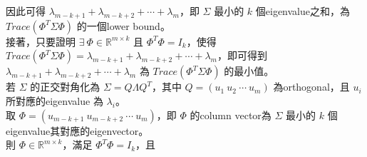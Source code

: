 \documentclass{article}
\begin{document}
因此可得 $\lambda_{m - k + 1} + \lambda_{m - k + 2} + \cdots + \lambda_m$，即 $\Sigma$ 最小的 $k$ 個eigenvalue之和，為 $Trace(\Phi^T \Sigma \Phi)$ 的一個lower bound。\\
接著，只要證明 $\exists\ \Phi \in {\mathbb R}^{m \times k}$ 且 $\Phi^T \Phi = I_k$，使得 $Trace(\Phi^T \Sigma \Phi) = \lambda_{m - k + 1} + \lambda_{m - k + 2} + \cdots + \lambda_m$，即可得到 $\lambda_{m - k + 1} + \lambda_{m - k + 2} + \cdots + \lambda_m$ 為 $Trace(\Phi^T \Sigma \Phi)$ 的最小值。\\
若 $\Sigma$ 的正交對角化為 $\Sigma = Q \Lambda Q^T$，其中 $Q = \left( u_1\ u_2\ \cdots\ u_m \right)$ 為orthogonal，且 $u_i$ 所對應的eigenvalue 為 $\lambda_i$。\\
取 $\Phi = \left( u_{m - k + 1}\ u_{m - k + 2}\ \cdots\ u_m \right)$，即 $\Phi$ 的column vector為 $\Sigma$ 最小的 $k$ 個eigenvalue其對應的eigenvector。\\
則 $\Phi \in {\mathbb R}^{m \times k}$，滿足 $\Phi^T \Phi = I_k$，且
\end{document}
